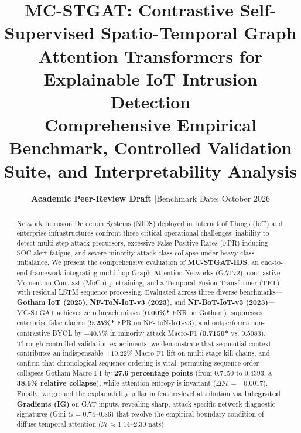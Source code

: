 \documentclass[10pt,a4paper]{article}
\title{\vspace{-1.5em}\textbf{\textcolor{primaryblue}{MC-STGAT: Contrastive Self-Supervised Spatio-Temporal Graph Attention Transformers for Explainable IoT Intrusion Detection}}\\\large Comprehensive Empirical Benchmark, Controlled Validation Suite, and Interpretability Analysis\vspace{-0.5em}}
\author{\textbf{Academic Peer-Review Draft} \quad|\quad Benchmark Date: October 2026}
\date{\vspace{-1em}}
\newcommand{\best}[1]{\textbf{\textcolor{bestgreen}{#1*}}}
\begin{document}
\maketitle

\begin{abstract}
\noindent Network Intrusion Detection Systems (NIDS) deployed in Internet of Things (IoT) and enterprise infrastructures confront three critical operational challenges: inability to detect multi-step attack precursors, excessive False Positive Rates (FPR) inducing SOC alert fatigue, and severe minority attack class collapse under heavy class imbalance. We present the comprehensive evaluation of \textbf{MC-STGAT-IDS}, an end-to-end framework integrating multi-hop Graph Attention Networks (GATv2), contrastive Momentum Contrast (MoCo) pretraining, and a Temporal Fusion Transformer (TFT) with residual LSTM sequence processing. Evaluated across three diverse benchmarks—\textbf{Gotham IoT (2025)}, \textbf{NF-ToN-IoT-v3 (2023)}, and \textbf{NF-BoT-IoT-v3 (2023)}—MC-STGAT achieves zero breach misses (\best{0.00\%} FNR on Gotham), suppresses enterprise false alarms (\best{9.25\%} FPR on NF-ToN-IoT-v3), and outperforms non-contrastive BYOL by $+40.7\%$ in minority attack Macro-F1 (\best{0.7150} vs. $0.5083$). Through controlled validation experiments, we demonstrate that sequential context contributes an indispensable $+10.22\%$ Macro-F1 lift on multi-stage kill chains, and confirm that chronological sequence ordering is vital: permuting sequence order collapses Gotham Macro-F1 by \textbf{27.6 percentage points} (from 0.7150 to 0.4393, a \textbf{38.6\% relative collapse}), while attention entropy is invariant ($\Delta\mathcal{H} = -0.0017$). Finally, we ground the explainability pillar in feature-level attribution via \textbf{Integrated Gradients (IG)} on GAT inputs, revealing sharp, attack-specific network diagnostic signatures (Gini $G = 0.74\text{--}0.86$) that resolve the empirical boundary condition of diffuse temporal attention ($\mathcal{H} \approx 1.14\text{--}2.30$ nats).
\end{abstract}
\end{document}
